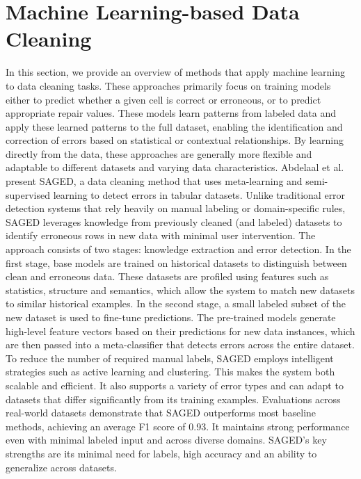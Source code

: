 \section{Machine Learning-based Data Cleaning}
In this section, we provide an overview of methods that apply machine learning to data cleaning tasks. 
These approaches primarily focus on training models either to predict whether a given cell is correct or erroneous, or to predict appropriate repair values.
These models learn patterns from labeled data and apply these learned patterns to the full dataset, enabling the identification and correction of errors based on statistical or contextual relationships.
By learning directly from the data, these approaches are generally more flexible and adaptable to different datasets and varying data characteristics.
\newline\newline
Abdelaal et al. \cite{SAGED} present SAGED, a data cleaning method that uses meta-learning and semi-supervised learning to detect errors in tabular datasets. 
Unlike traditional error detection systems that rely heavily on manual labeling or domain-specific rules, SAGED leverages knowledge from previously cleaned (and labeled) datasets to identify erroneous rows in new data with minimal user intervention. 
The approach consists of two stages: knowledge extraction and error detection. 
In the first stage, base models are trained on historical datasets to distinguish between clean and erroneous data. 
These datasets are profiled using features such as statistics, structure and semantics, which allow the system to match new datasets to similar historical examples. 
In the second stage, a small labeled subset of the new dataset is used to fine-tune predictions. 
The pre-trained models generate high-level feature vectors based on their predictions for new data instances, which are then passed into a meta-classifier that detects errors across the entire dataset. 
To reduce the number of required manual labels, SAGED employs intelligent strategies such as active learning and clustering. 
This makes the system both scalable and efficient. It also supports a variety of error types and can adapt to datasets that differ significantly from its training examples. 
Evaluations across real-world datasets demonstrate that SAGED outperforms most baseline methods, achieving an average F1 score of 0.93. 
It maintains strong performance even with minimal labeled input and across diverse domains. 
SAGED's key strengths are its minimal need for labels, high accuracy and an ability to generalize across datasets. 
